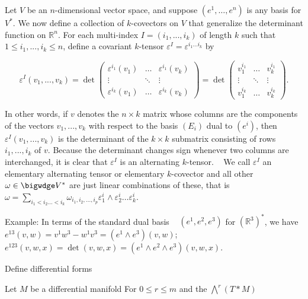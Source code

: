 Let \(V\) be an \(n\)-dimensional vector space, and suppose \((e^1, \dots, e^n)\) is any basis for \(V^*\). 
We now define a collection of \(k\)-covectors on \(V\) that generalize the determinant function on \(\mathbb{R}^n\). 
For each multi-index \(I = (i_1, ..., i_k)\) of length \(k\) such that \(1 \leq i_1, ..., i_k \leq n\), 
define a covariant \(k\)-tensor \(\varepsilon^I = \varepsilon^{i_1 \dots i_k}\) by 

\[\varepsilon^I (v_1, ..., v_k) = \det 
\begin{pmatrix}
\varepsilon^{i_1}(v_1) & \dots & \varepsilon^{i_1}(v_k) \\
\vdots & \ddots & \vdots \\
\varepsilon^{i_k}(v_1) & \dots & \varepsilon^{i_k}(v_k)
\end{pmatrix} = \det 
\begin{pmatrix}
v_1^{i_1} & \dots & v_k^{i_1} \\
\vdots & \ddots & \vdots \\
v_1^{i_k} & \dots & v_k^{i_k}
\end{pmatrix}. 
\]

In other words, if \(v\) denotes the \(n \times k\) matrix whose columns are the components of the vectors \(v_1, ..., v_k\) 
with respect to the basis \((E_i)\) dual to \((e^i)\), then \(\varepsilon^I(v_1, ..., v_k)\) 
is the determinant of the \(k \times k\) submatrix consisting of rows \(i_1, ..., i_k\) of \(v\). 
Because the determinant changes sign whenever two columns are interchanged, 
it is clear that \(\varepsilon^I\) is an alternating \(k\)-tensor.   
We call \(\varepsilon^I\) an elementary alternating tensor or elementary \(k\)-covector
and all other \( \omega \in \bigwdge V^\ast \) are just linear combinations of these,
that is 
\( \omega = \sum_{i_1 < i_2 \dots < i_k} \omega_{i_1, i_2, \dots, i_p} \varepsilon^i_1 \wedge \varepsilon^i_2 \dots \varepsilon^i_k \).

Example: In terms of the standard dual basis   
\((e^1, e^2, e^3)\) for \((\mathbb{R}^3)^*\), we have
\(e^{13}(v, w) = v^1 w^3 - w^1 v^3 = (e^1 \wedge e^3)(v, w)\);
\(e^{123}(v, w, x) = \det(v, w, x) = (e^1 \wedge e^2 \wedge e^3)(v, w, x)\). 



Define differential forms

Let \( M \) be a differential manifold
For \( 0 \leq r \leq m \) and the  \( \bigwedge^r(T*M) \)
